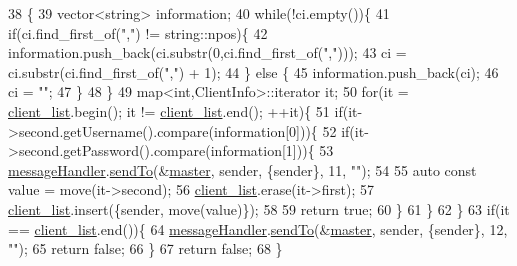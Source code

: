 \begin{DoxyCode}
38                                              \{
39     vector<string> information;
40     \textcolor{keywordflow}{while}(!ci.empty())\{
41         \textcolor{keywordflow}{if}(ci.find\_first\_of(\textcolor{stringliteral}{","}) != string::npos)\{
42             information.push\_back(ci.substr(0,ci.find\_first\_of(\textcolor{stringliteral}{","})));
43             ci = ci.substr(ci.find\_first\_of(\textcolor{stringliteral}{","}) + 1);
44         \} \textcolor{keywordflow}{else} \{
45             information.push\_back(ci);
46             ci = \textcolor{stringliteral}{""};
47         \}
48     \}
49     map<int,ClientInfo>::iterator it;
50     \textcolor{keywordflow}{for}(it = \hyperlink{class_client_list_a53c73362bff032aa6fceab4b8b5b39de}{client\_list}.begin(); it != \hyperlink{class_client_list_a53c73362bff032aa6fceab4b8b5b39de}{client\_list}.end(); ++it)\{
51         \textcolor{keywordflow}{if}(it->second.getUsername().compare(information[0]))\{
52             \textcolor{keywordflow}{if}(it->second.getPassword().compare(information[1]))\{
53                 \hyperlink{class_client_list_a15fd10297f79e0d1278d3b106c715390}{messageHandler}.\hyperlink{class_message_handler_a81dd916f61ef7f19d10cd3adee55bda9}{sendTo}(&\hyperlink{class_client_list_a819f5455b1afa484d846d5b6ef4209a7}{master}, sender, \{sender\}, 11, \textcolor{stringliteral}{""});
54 
55                 \textcolor{keyword}{auto} \textcolor{keyword}{const} value = move(it->second);
56                 \hyperlink{class_client_list_a53c73362bff032aa6fceab4b8b5b39de}{client\_list}.erase(it->first);
57                 \hyperlink{class_client_list_a53c73362bff032aa6fceab4b8b5b39de}{client\_list}.insert(\{sender, move(value)\});
58                 
59                 \textcolor{keywordflow}{return} \textcolor{keyword}{true};
60             \}
61         \}           
62     \}
63     \textcolor{keywordflow}{if}(it == \hyperlink{class_client_list_a53c73362bff032aa6fceab4b8b5b39de}{client\_list}.end())\{
64         \hyperlink{class_client_list_a15fd10297f79e0d1278d3b106c715390}{messageHandler}.\hyperlink{class_message_handler_a81dd916f61ef7f19d10cd3adee55bda9}{sendTo}(&\hyperlink{class_client_list_a819f5455b1afa484d846d5b6ef4209a7}{master}, sender, \{sender\}, 12, \textcolor{stringliteral}{""});
65         \textcolor{keywordflow}{return} \textcolor{keyword}{false};
66     \}           
67     \textcolor{keywordflow}{return} \textcolor{keyword}{false};
68 \}
\end{DoxyCode}
